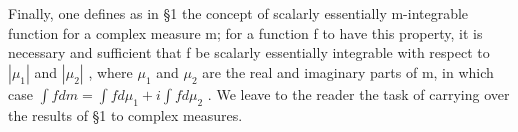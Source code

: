 Finally, one defines as in §1 the concept of scalarly essentially m-integrable function for a complex measure m; for a function f to have this property, it is necessary and sufficient that f be scalarly essentially integrable with respect to \(|\mu_{1}|\) and \(|\mu_{2}|\) , where \(\mu_{1}\) and \(\mu_{2}\) are the real and imaginary parts of m, in which case \(\int f dm = \int f d\mu_{1} + i \int f d\mu_{2}\) . We leave to the reader the task of carrying over the results of §1 to complex measures.

